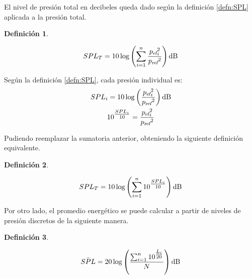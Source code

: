 \documentclass[a5paper,12pt,twoside]{book}
\newtheorem{defn}{{Definición}}[chapter]
\begin{document}
El nivel de presión total en decibeles queda dado según la definición \ref{defn:SPL} aplicada a la presión total.


\begin{mdframed}[style=MyFrame1]
    \begin{defn}
    \end{defn}
    \begin{equation*}
        SPL_T = 10 \log \left( \sum_{\ith=1}^\nth \frac{\rms{p}_\ith^2}{\sub{p}{ref}^2} \right) \si{\deci\bel}
    \end{equation*}
\end{mdframed}

Según la definición \ref{defn:SPL}, cada presión individual es:
\begin{gather*}
    SPL_\ith = 10 \log \left( \frac{\rms{p}_\ith^2}{\sub{p}{ref}^2} \right) \si{\deci\bel}
    \\
    10^{\tfrac{SPL_\ith}{10}} = \frac{\rms{p}_\ith^2}{\sub{p}{ref}^2}
\end{gather*}

Pudiendo reemplazar la sumatoria anterior, obteniendo la siguiente definición equivalente.

\begin{mdframed}[style=MyFrame1]
    \begin{defn}
    \end{defn}
    \begin{equation*}
        SPL_T = 10 \log \left( \sum_{\ith=1}^\nth 10^{\tfrac{SPL_\ith}{10}} \right) \si{\deci\bel}
    \end{equation*}
\end{mdframed}

Por otro lado, el promedio energético se puede calcular a partir de niveles de presión discretos de la siguiente manera.

\begin{mdframed}[style=MyFrame1]
    \begin{defn}
    \end{defn}
    \begin{equation*}
        \ave{SPL}=20\log\left(\frac{\sum_{\ith=1}^\nth 10^{\tfrac{L_\ith}{20}}}{N}\right) \si{\deci\bel}
    \end{equation*}
\end{mdframed}
\end{document}
